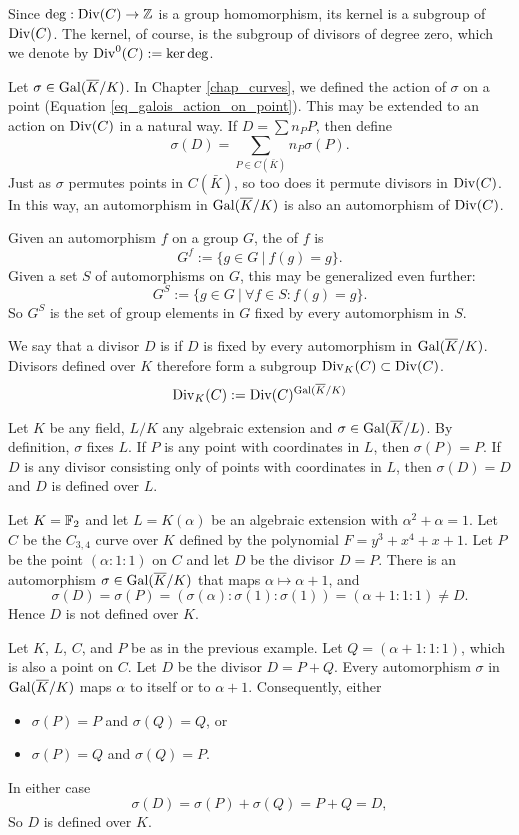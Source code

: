 Since $\deg : \operatorname{Div}(C) \to \mathbb{Z}$ is a group homomorphism, its kernel is a subgroup of $\operatorname{Div}(C)$.
The kernel, of course, is the subgroup of divisors of degree zero, which we denote by $\operatorname{Div}^0(C) := \ker \deg$.

Let $\sigma \in \operatorname{Gal}(\overline K / K)$.
In Chapter \ref{chap_curves}, we defined the action of $\sigma$ on a point (Equation \ref{eq_galois_action_on_point}).
This may be extended to an action on $\operatorname{Div}(C)$ in a natural way.
If $D = \sum n_P P$, then define
\[ \sigma(D) = \sum_{P \in C(\bar K)} n_P \sigma(P). \]
Just as $\sigma$ permutes points in $C(\bar K)$, so too does it permute divisors in $\operatorname{Div}(C)$.
In this way, an automorphism in $\operatorname{Gal}(\overline K/K)$ is also an automorphism of $\operatorname{Div}(C)$.

Given an automorphism $f$ on a group $G$, the  of $f$ is
  \[ G^f := \{ g \in G ~|~ f(g) = g \}. \]
Given a set $S$ of automorphisms on $G$, this may be generalized even further:
  \[ G^S := \{ g \in G ~|~ \forall f \in S : f(g) = g \}. \]
So $G^S$ is the set of group elements in $G$ fixed by every automorphism in $S$.

We say that a divisor $D$ is  if $D$ is fixed by every automorphism in $\operatorname{Gal}(\overline K/K)$.
Divisors defined over $K$ therefore form a subgroup $\operatorname{Div}_K(C) \subset \operatorname{Div}(C)$.
  \[ \operatorname{Div}_K(C) := \operatorname{Div}(C)^{\operatorname{Gal}(\overline K/K)} \]

\begin{example}
  Let $K$ be any field, $L/K$ any algebraic extension and $\sigma \in \operatorname{Gal}(\overline K/L)$.
  By definition, $\sigma$ fixes $L$.
  If $P$ is any point with coordinates in $L$, then $\sigma(P) = P$.
  If $D$ is any divisor consisting only of points with coordinates in $L$, then $\sigma(D) = D$ and $D$ is defined over $L$.
\end{example}
\begin{example}
  \label{ex_not_defined_over_k}
  Let $K = \mathbb{F}_2$ and let $L = K(\alpha)$ be an algebraic extension with $\alpha^2 + \alpha = 1$.
  Let $C$ be the $C_{3,4}$ curve over $K$ defined by the polynomial $F = y^3 + x^4 + x + 1$.
  Let $P$ be the point $(\alpha : 1 : 1)$ on $C$ and let $D$ be the divisor $D = P$.
  There is an automorphism $\sigma \in \operatorname{Gal}(\overline K/K)$ that maps $\alpha \mapsto \alpha + 1$, and
    \[ \sigma(D) = \sigma(P) = (\sigma(\alpha) : \sigma(1) : \sigma(1)) = (\alpha + 1 : 1 : 1) \neq D. \]
  Hence $D$ is not defined over $K$.
\end{example}
\begin{example}
  \label{ex_defined_over_k}
  Let $K$, $L$, $C$, and $P$ be as in the previous example.
  Let $Q = (\alpha + 1 : 1 : 1)$, which is also a point on $C$.
  Let $D$ be the divisor $D = P + Q$.
  Every automorphism $\sigma$ in $\operatorname{Gal}(\overline K/K)$ maps $\alpha$ to itself or to $\alpha + 1$.
  Consequently, either
  \begin{itemize}
    \item $\sigma(P) = P$ and $\sigma(Q) = Q$, or
    \item $\sigma(P) = Q$ and $\sigma(Q) = P$.
  \end{itemize}
  In either case
  \[ \sigma(D) = \sigma(P) + \sigma(Q) = P + Q = D, \]
  So $D$ is defined over $K$.
\end{example}

